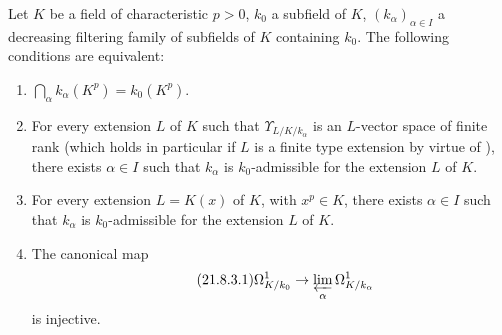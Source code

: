 \begin{theorem}[21.8.3]
\label{0.21.8.3}
Let $K$ be a field of characteristic $p>0$, $k_0$ a subfield of $K$, $(k_\alpha)_{\alpha\in I}$ a decreasing filtering family of subfields of $K$ containing $k_0$.
The following conditions are equivalent:
\begin{enumerate}
  \item[\rm a)] $\bigcap_\alpha k_\alpha(K^p)=k_0(K^p)$.
  \item[\rm b)] For every extension $L$ of $K$ such that $\Upsilon_{L/K/k_\alpha}$ is an $L$-vector space of finite rank \textup{(}which holds in particular if $L$ is a finite type extension by virtue of \textup{)}, there exists $\alpha\in I$ such that $k_\alpha$ is $k_0$-admissible for the extension $L$ of $K$.
  \item[\rm b$'$)] For every extension $L=K(x)$ of $K$, with $x^p\in K$, there exists $\alpha\in I$ such that $k_\alpha$ is $k_0$-admissible for the extension $L$ of $K$.
  \item[\rm c)] The canonical map
  \begin{equation}
  \tag{21.8.3.1}
  \label{0.21.8.3.1}
    \Omega^1_{K/k_0}\to\varprojlim_\alpha\Omega^1_{K/k_\alpha}
  \end{equation}
  is injective.
\end{enumerate}
\end{theorem}

